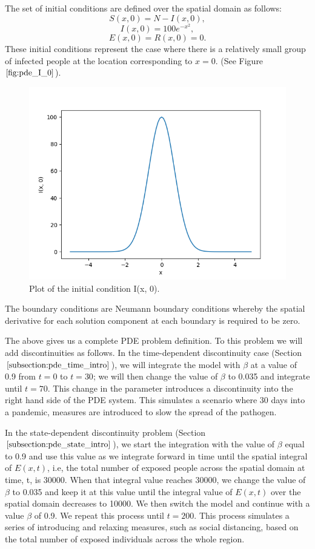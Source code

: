 The set of initial conditions are defined over the spatial domain as follows:
\begin{equation}
S(x, 0) = N - I(x, 0),
\end{equation}
\begin{equation}
I(x, 0) = 100e^{-x^2},
\end{equation}
\begin{equation}
E(x, 0) = R(x, 0) = 0.
\end{equation}
These initial conditions represent the case where there is a relatively small group of infected people at the location corresponding to $x=0$. (See Figure $\ref{fig:pde_I_0}$).

\begin{figure}[H]
\centering
\includegraphics[width=0.7\linewidth]{./figures/pde_I_0}
\caption{Plot of the initial condition I(x, 0).}
\label{fig:pde_I_0}
\end{figure}

The boundary conditions are Neumann boundary conditions whereby the spatial derivative for each solution component at each boundary is required to be zero.

The above gives us a complete PDE problem definition. To this problem we will add discontinuities as follows. 
In the time-dependent discontinuity case (Section $\ref{subsection:pde_time_intro}$), we will integrate the model with $\beta$ at a value of 0.9 from $t=0$ to $t=30$; we will then change the value of $\beta$ to 0.035 and integrate until $t=70$. This change in the parameter introduces a discontinuity into the right hand side of the PDE system. This simulates a scenario where 30 days into a pandemic, measures are introduced to slow the spread of the pathogen.

In the state-dependent discontinuity problem (Section $\ref{subsection:pde_state_intro}$), we start the integration with the value of $\beta$ equal to 0.9 and use this value as we integrate forward in time until the spatial integral of $E(x, t)$, i.e, the total number of exposed people across the spatial domain at time, t, is 30000. When that integral value reaches 30000, we change the value of $\beta$ to 0.035 and keep it at this value until the integral value of $E(x, t)$ over the spatial domain decreases to 10000. We then switch the model and continue with a value $\beta$ of 0.9. We repeat this process until $t=200$. This process simulates a series of introducing and relaxing measures, such as social distancing, based on the total number of exposed individuals across the whole region.

